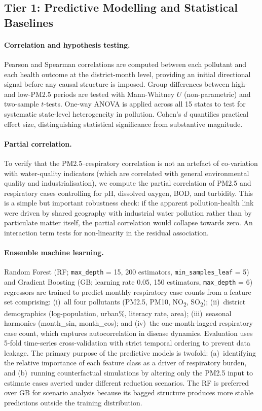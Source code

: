 \documentclass{article}
\begin{document}
\subsection{Tier 1: Predictive Modelling and Statistical Baselines}

\paragraph{Correlation and hypothesis testing.}
Pearson and Spearman correlations are computed between each pollutant and each health
outcome at the district-month level, providing an initial directional signal before
any causal structure is imposed. Group differences between high- and low-PM2.5 periods
are tested with Mann-Whitney $U$ (non-parametric) and two-sample $t$-tests. One-way
ANOVA is applied across all 15 states to test for systematic state-level heterogeneity
in pollution. Cohen's $d$ quantifies practical effect size, distinguishing statistical
significance from substantive magnitude.

\paragraph{Partial correlation.}
To verify that the PM2.5--respiratory correlation is not an artefact of co-variation with
water-quality indicators (which are correlated with general environmental quality and
industrialisation), we compute the partial correlation of PM2.5 and respiratory cases
controlling for pH, dissolved oxygen, BOD, and turbidity. This is a simple but important
robustness check: if the apparent pollution-health link were driven by shared geography
with industrial water pollution rather than by particulate matter itself, the partial
correlation would collapse towards zero. An interaction term tests for non-linearity in
the residual association.

\paragraph{Ensemble machine learning.}
Random Forest (RF; \texttt{max\_depth} = 15, 200 estimators, \texttt{min\_samples\_leaf} = 5)
and Gradient Boosting (GB; learning rate 0.05, 150 estimators, \texttt{max\_depth} = 6)
regressors are trained to predict monthly respiratory case counts from a feature set
comprising: (i)~all four pollutants (PM2.5, PM10, NO\textsubscript{2}, SO\textsubscript{2});
(ii)~district demographics (log-population, urban\%, literacy rate, area); (iii)~seasonal
harmonics (month\_sin, month\_cos); and (iv)~the one-month-lagged respiratory case count,
which captures autocorrelation in disease dynamics. Evaluation uses 5-fold time-series
cross-validation with strict temporal ordering to prevent data leakage. The primary
purpose of the predictive models is twofold: (a)~identifying the relative importance of
each feature class as a driver of respiratory burden, and (b)~running counterfactual
simulations by altering only the PM2.5 input to estimate cases averted under different
reduction scenarios. The RF is preferred over GB for scenario analysis because its bagged
structure produces more stable predictions outside the training distribution.
\end{document}
